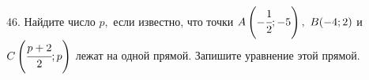46. Найдите число $p,$ если известно, что точки $A\left(-\cfrac{1}{2};-5\right),\ B(-4;2)$ и $C\left(\cfrac{p+2}{2}; p\right)$ лежат на одной прямой. Запишите уравнение этой прямой.\\

